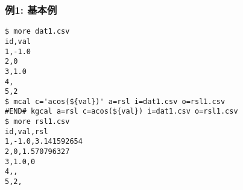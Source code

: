 \subsubsection*{例1: 基本例}



\begin{Verbatim}[baselinestretch=0.7,frame=single]
$ more dat1.csv
id,val
1,-1.0
2,0
3,1.0
4,
5,2
$ mcal c='acos(${val})' a=rsl i=dat1.csv o=rsl1.csv
#END# kgcal a=rsl c=acos(${val}) i=dat1.csv o=rsl1.csv
$ more rsl1.csv
id,val,rsl
1,-1.0,3.141592654
2,0,1.570796327
3,1.0,0
4,,
5,2,
\end{Verbatim}
